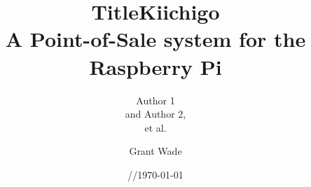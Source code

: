 \documentclass[11pt]{report}
\title{\textbf{Title}}
\author{Author 1\\and Author 2,\\et al.}
\date{\oldstylenums{00}/\oldstylenums{00}/\oldstylenums{00}}
\begin{document}
	
	\title{\textbf{Kiichigo} \\ A Point-of-Sale system for the Raspberry Pi}
	
	\author{Grant Wade}
	\date{\today}
\maketitle
 
\newpage

\tableofcontents

\newpage


\newpage


\newpage


\newpage


\newpage


\newpage


\newpage


\newpage

\end{document}
